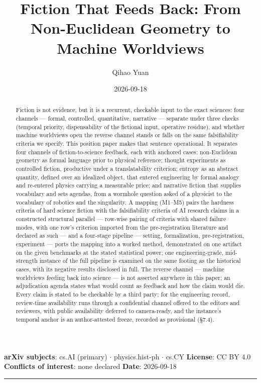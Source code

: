 \documentclass[11pt,a4paper]{article}
\title{Fiction That Feeds Back: From Non-Euclidean Geometry to Machine Worldviews}
\author{Qihao Yuan}
\date{2026-09-18}
\begin{document}
\maketitle
\thispagestyle{empty}
\vspace{0.5em}
\noindent\textbf{arXiv subjects}: cs.AI (primary) $\cdot$ physics.hist-ph $\cdot$ cs.CY \quad \textbf{License}: CC BY 4.0 \quad \textbf{Conflicts of interest}: none declared \quad \textbf{Date}: 2026-09-18
\vspace{0.5em}
\hrule
\vspace{0.8em}

\begin{abstract}


Fiction is not evidence, but it is a recurrent, checkable input to the exact sciences: four channels — formal, controlled, quantitative, narrative — separate under three checks (temporal priority, dispensability of the fictional input, operative residue), and whether machine worldviews open the reverse channel stands or falls on the same falsifiability criteria we specify. This position paper makes that sentence operational. It separates four channels of fiction-to-science feedback, each with anchored cases: non-Euclidean geometry as formal language prior to physical reference; thought experiments as controlled fiction, productive under a translatability criterion; entropy as an abstract quantity, defined over an idealized object, that entered engineering by formal analogy and re-entered physics carrying a measurable price; and narrative fiction that supplies vocabulary and sets agendas, from a wormhole question asked of a physicist to the vocabulary of robotics and the singularity. A mapping (M1–M5) pairs the hardness criteria of hard science fiction with the falsifiability criteria of AI research claims in a constructed structural parallel — row-wise pairing of criteria with shared failure modes, with one row's criterion imported from the pre-registration literature and declared as such — and a four-stage pipeline — setting, formalization, pre-registration, experiment — ports the mapping into a worked method, demonstrated on one artifact on the given benchmarks at the stated statistical power; one engineering-grade, mid-strength instance of the full pipeline is examined on the same footing as the historical cases, with its negative results disclosed in full. The reverse channel — machine worldviews feeding back into science — is not asserted anywhere in this paper; an adjudication agenda states what would count as feedback and how the claim would die. Every claim is stated to be checkable by a third party; for the engineering record, review-time availability runs through a confidential channel offered to the editors and reviewers, with public availability deferred to camera-ready, and the instance's temporal anchor is an author-attested freeze, recorded as provisional (§7.4).

\end{abstract}
\end{document}
